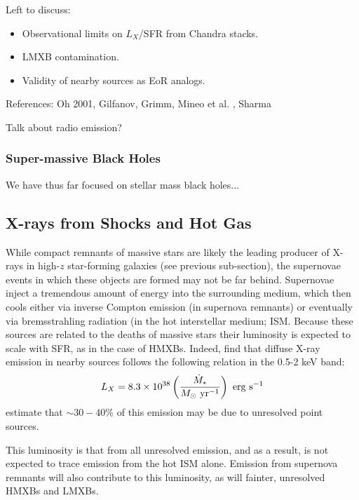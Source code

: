 \cite[e.g.,][]{Mirabel2011,Mirocha2018}


Left to discuss:
\begin{itemize}
	\item Observational limits on $L_X$/SFR from Chandra stacks.
	\item LMXB contamination.
	\item Validity of nearby sources as EoR analogs.
\end{itemize}


References: Oh 2001, Gilfanov, Grimm, Mineo et al. , Sharma


Talk about radio emission?


\subsubsection{Super-massive Black Holes}
We have thus far focused on stellar mass black holes...



\subsection{X-rays from Shocks and Hot Gas}
While compact remnants of massive stars are likely the leading producer of X-rays in high-$z$ star-forming galaxies (see previous sub-section), the supernovae events in which these objects are formed may not be far behind. Supernovae inject a tremendous amount of energy into the surrounding medium, which then cools either via inverse Compton emission (in supernova remnants)  or eventually via bremsstrahling radiation (in the hot interstellar medium; ISM. Because these sources are related to the deaths of massive stars their luminosity is expected to scale with SFR, as in the case of HMXBs. Indeed, \cite{Mineo2012b} find that diffuse X-ray emission in nearby sources follows the following relation in the 0.5-2 keV band:
\begin{equation}
	L_X = 8.3 \times 10^{38} \left(\frac{\SFR}{M_{\odot} \ \mathrm{yr}^{-1}} \right) \ \mathrm{erg} \ \mathrm{s}^{-1} \label{eq:LxSFRII_Mineo}
\end{equation}
\cite{Mineo2012b} estimate that $\sim 30-40$\% of this emission may be due to unresolved point sources. 

This luminosity is that from all unresolved emission, and as a result, is not expected to trace emission from the hot ISM alone. Emission from supernova remnants will also contribute to this luminosity, as will fainter, unresolved HMXBs and LMXBs.


